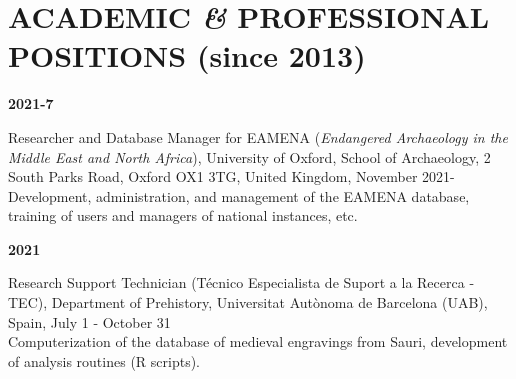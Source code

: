 \documentclass{article}
\newcommand{\fr}[1]{}       %
\newcommand{\en}[1]{#1}     %
\begin{document}
\section{\fr{POSTES ACADÉMIQUES \textit{\&} PROFESSIONNELS (depuis 2013)}\en{ACADEMIC \textit{\&} PROFESSIONAL POSITIONS (since 2013)}}

\textbf{2021-7} 
\fr{Chercheur et responsable de la base de données EAMENA (\textit{Endangered Archaeology in the Middle East and North Africa}), Université d'Oxford, School of Archaeology, 2 South Parks Road, Oxford OX1 3TG, Royaume-Uni, novembre 2021-\\
\hspace*{0.5cm} Développement, administration et gestion de la base de données EAMENA, formation des utilisateurs et des gestionnaires des instances nationales, etc.}
\en{Researcher and Database Manager for EAMENA (\textit{Endangered Archaeology in the Middle East and North Africa}), University of Oxford, School of Archaeology, 2 South Parks Road, Oxford OX1 3TG, United Kingdom, November 2021-\\
\hspace*{0.5cm} Development, administration, and management of the EAMENA database, training of users and managers of national instances, etc.}

\smallbreak
\textbf{2021} 
\fr{Technicien de Support à la recherche (Técnico Especialista de Suport a la Recerca - TEC), Département de Préhistoire, Universitat Autònoma de Barcelona (UAB), Espagne, 1er juillet-31 octobre \\
\hspace*{0.5cm} Informatisation de la base de données des gravures médiévales de Sauri, développement de routines d'analyses (scripts R).}
\en{Research Support Technician (Técnico Especialista de Suport a la Recerca - TEC), Department of Prehistory, Universitat Autònoma de Barcelona (UAB), Spain, July 1 - October 31 \\
\hspace*{0.5cm} Computerization of the database of medieval engravings from Sauri, development of analysis routines (R scripts).}
\end{document}
